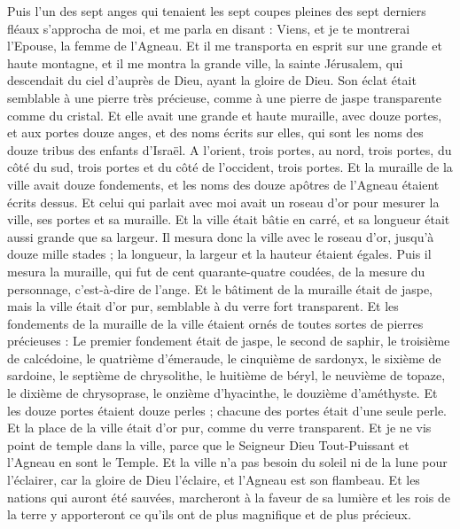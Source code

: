 \begin{multicols}{2}
Puis l'un des sept anges qui tenaient les sept coupes pleines des sept derniers fléaux s'approcha de moi, et me parla en disant : Viens, et je te montrerai l'Epouse, la femme de l'Agneau.
Et il me transporta en esprit sur une grande et haute montagne, et il me montra la grande ville, la sainte Jérusalem, qui descendait du ciel d'auprès de Dieu,
ayant la gloire de Dieu. Son éclat était semblable à une pierre très précieuse, comme à une pierre de jaspe transparente comme du cristal.
Et elle avait une grande et haute muraille, avec douze portes, et aux portes douze anges, et des noms écrits sur elles, qui sont les noms des douze tribus des enfants d'Israël.
A l'orient, trois portes, au nord, trois portes, du côté du sud, trois portes et du côté de l'occident, trois portes.
Et la muraille de la ville avait douze fondements, et les noms des douze apôtres de l'Agneau étaient écrits dessus.
Et celui qui parlait avec moi avait un roseau d'or pour mesurer la ville, ses portes et sa muraille.
Et la ville était bâtie en carré, et sa longueur était aussi grande que sa largeur. Il mesura donc la ville avec le roseau d'or, jusqu'à douze mille stades ; la longueur, la largeur et la hauteur étaient égales.
Puis il mesura la muraille, qui fut de cent quarante-quatre coudées, de la mesure du personnage, c'est-à-dire de l'ange.
Et le bâtiment de la muraille était de jaspe, mais la ville était d'or pur, semblable à du verre fort transparent.
Et les fondements de la muraille de la ville étaient ornés de toutes sortes de pierres précieuses : Le premier fondement était de jaspe, le second de saphir, le troisième de calcédoine, le quatrième d'émeraude,
le cinquième de sardonyx, le sixième de sardoine, le septième de chrysolithe, le huitième de béryl, le neuvième de topaze, le dixième de chrysoprase, le onzième d'hyacinthe, le douzième d'améthyste.
Et les douze portes étaient douze perles ; chacune des portes était d'une seule perle. Et la place de la ville était d'or pur, comme du verre transparent.
Et je ne vis point de temple dans la ville, parce que le Seigneur Dieu Tout-Puissant et l'Agneau en sont le Temple.
Et la ville n'a pas besoin du soleil ni de la lune pour l'éclairer, car la gloire de Dieu l'éclaire, et l'Agneau est son flambeau.
Et les nations qui auront été sauvées, marcheront à la faveur de sa lumière et les rois de la terre y apporteront ce qu'ils ont de plus magnifique et de plus précieux.

\end{multicols}
